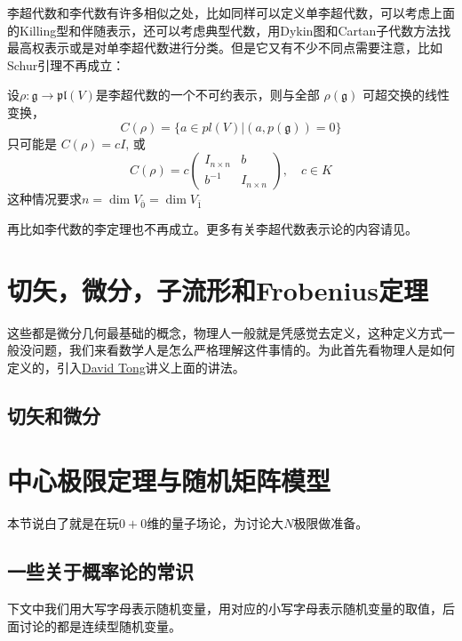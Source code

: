 李超代数和李代数有许多相似之处，比如同样可以定义单李超代数，可以考虑上面的Killing型和伴随表示，还可以考虑典型代数，用Dykin图和Cartan子代数方法找最高权表示或是对单李超代数进行分类。但是它又有不少不同点需要注意，比如Schur引理不再成立：
\begin{theorem}[超Schur引理]
	设$\rho:\mathfrak{g}\longrightarrow\mathfrak{pl}(V)$是李超代数的一个不可约表示，则与全部 $\rho(\mathfrak{g})$ 可超交换的线性变换，
	$$C(\rho)=\{a\in pl(V)|(a,p(\mathfrak{g}))=0\}$$
	只可能是 $C(\rho)=cI$, 或
	\[C(\rho)=c\begin{pmatrix}I_{n\times n}&b\\b^{-1}&I_{n\times n}\end{pmatrix},\quad c\in K\]
	这种情况要求$n=\dim V_{\bar 0}=\dim V_{\bar 1}$
\end{theorem}
再比如李代数的李定理也不再成立。更多有关李超代数表示论的内容请见\cite{superlie,WLXJ198301002,Kac:1977em}。
\section{切矢，微分，子流形和Frobenius定理}
这些都是微分几何最基础的概念，物理人一般就是凭感觉去定义，这种定义方式一般没问题，我们来看数学人是怎么严格理解这件事情的。为此首先看物理人是如何定义的，引入\href{https://www.damtp.cam.ac.uk/user/tong/gr.html}{David Tong}讲义上面的讲法。
\subsection{切矢和微分}

\section{中心极限定理与随机矩阵模型}
本节说白了就是在玩$0+0$维的量子场论，为讨论大$N$极限做准备。
\subsection{一些关于概率论的常识}
下文中我们用大写字母表示随机变量，用对应的小写字母表示随机变量的取值，后面讨论的都是连续型随机变量。

